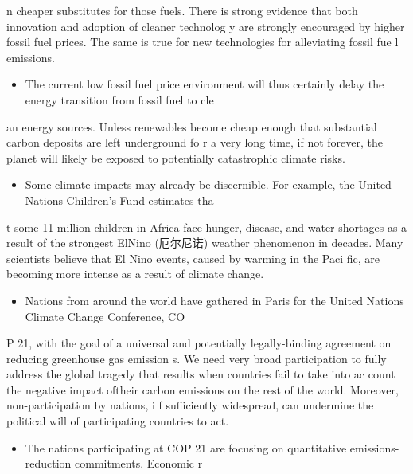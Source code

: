 \documentclass[UTF8,11pt]{ctexart}
\begin{document}
n cheaper substitutes for those fuels. There is strong evidence that both innovation and adoption of cleaner technolog y are strongly encouraged by higher fossil fuel prices. The same is true for new technologies for alleviating fossil fue l emissions.


\begin{itemize}[leftmargin=2em,itemsep=.2em,topsep=.4em]\item[I.] The current low fossil fuel price environment will thus certainly delay the energy transition from fossil fuel to cle
\end{itemize}

an energy sources. Unless renewables become cheap enough that substantial carbon deposits are left underground fo r a very long time, if not forever, the planet will likely be exposed to potentially catastrophic climate risks.


\begin{itemize}[leftmargin=2em,itemsep=.2em,topsep=.4em]\item[J.] Some climate impacts may already be discernible. For example, the United Nations Children's Fund estimates tha
\end{itemize}

t some 11 million children in Africa face hunger, disease, and water shortages as a result of the strongest ElNino (厄尔尼诺) weather phenomenon in decades. Many scientists believe that El Nino events, caused by warming in the Paci fic, are becoming more intense as a result of climate change.


\begin{itemize}[leftmargin=2em,itemsep=.2em,topsep=.4em]\item[K.] Nations from around the world have gathered in Paris for the United Nations Climate Change Conference, CO
\end{itemize}

P 21, with the goal of a universal and potentially legally-binding agreement on reducing greenhouse gas emission s. We need very broad participation to fully address the global tragedy that results when countries fail to take into ac count the negative impact oftheir carbon emissions on the rest of the world. Moreover, non-participation by nations, i f sufficiently widespread, can undermine the political will of participating countries to act.


\begin{itemize}[leftmargin=2em,itemsep=.2em,topsep=.4em]\item[L.] The nations participating at COP 21 are focusing on quantitative emissions-reduction commitments. Economic r
\end{itemize}
\end{document}
